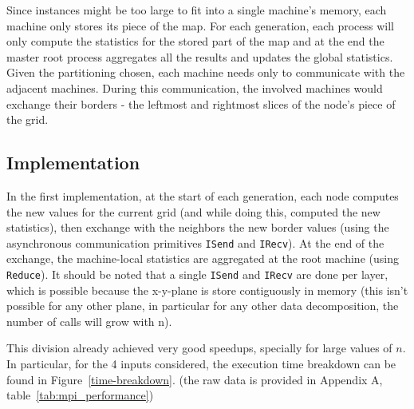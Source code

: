 \documentclass{article}
\begin{document}
Since instances might be too large to fit into a single machine's memory, each
machine only stores its piece of the map. For each generation, each process will
only compute the statistics for the stored part of the map and at the end the master
root process aggregates all the results and updates the global statistics.
Given the partitioning chosen, each machine needs only to 
communicate with the adjacent machines. During this 
communication, the involved machines would exchange their borders - the leftmost
and rightmost slices of the node's piece of the grid.



\subsection{Implementation}

In the first implementation, at the start of each generation, each node computes
the new values for the current grid (and while doing this, computed the new
statistics), then exchange with the neighbors the new border values (using the asynchronous
communication primitives \texttt{ISend} and \texttt{IRecv}). At the end of the
exchange, the machine-local statistics are aggregated at the root machine (using \texttt{Reduce}).
It should be noted that a single \texttt{ISend} and \texttt{IRecv} are done per layer,
which is possible because the x-y-plane is store contiguously in memory (this isn't possible
for any other plane, in particular for any other data decomposition, the number of calls will
grow with n).

This division already achieved very good speedups, specially for large values of 
$n$. In particular, for the 4 inputs considered, the execution time breakdown can
be found in Figure~\ref{time-breakdown}.
(the raw data is provided in Appendix A, table~\ref{tab:mpi_performance})
\end{document}
